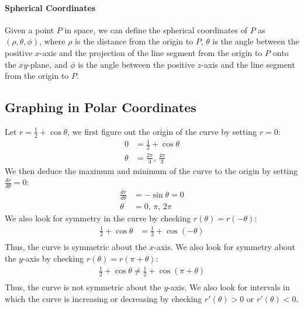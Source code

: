 \documentclass[11pt]{article}
\begin{document}
\paragraph{Spherical Coordinates} Given a point $P$ in space, we can define the spherical coordinates of $P$ as $(\rho, \theta, \phi)$, where $\rho$ is the distance from the origin to $P$, $\theta$ is the angle between the positive $x$-axis and the projection of the line segment from the origin to $P$ onto the $xy$-plane, and $\phi$ is the angle between the positive $z$-axis and the line segment from the origin to $P$.
\subsection{Graphing in Polar Coordinates}
\begin{example}
    Let $r = \frac{1}{2} + \cos \theta$, we first figure out the origin of the curve by setting $r = 0$:
    \begin{align*}
        0 &= \frac{1}{2} + \cos \theta \\
        \theta &= \frac{2\pi}{3},\, \frac{4\pi}{3}
    \end{align*}
    We then deduce the maximum and minimum of the curve to the origin by setting $\frac{dr}{d\theta} = 0$:
    \begin{align*}
        \frac{dr}{d\theta} &= -\sin \theta = 0 \\
        \theta &= 0,\, \pi,\, 2\pi
    \end{align*}
    We also look for symmetry in the curve by checking $r(\theta) = r(-\theta)$:
    \begin{align*}
        \frac{1}{2} + \cos \theta &= \frac{1}{2} + \cos(-\theta) \\
    \end{align*}
    Thus, the curve is symmetric about the $x$-axis. We also look for symmetry about the $y$-axis by checking $r(\theta) = r(\pi + \theta)$:
    \begin{align*}
        \frac{1}{2} + \cos \theta \neq \frac{1}{2} + \cos(\pi + \theta) \\
    \end{align*}
    Thus, the curve is not symmetric about the $y$-axis. We also look for intervals in which the curve is increasing or decreasing by checking $r'(\theta) > 0$ or $r'(\theta) < 0$.
\end{example}
\end{document}
